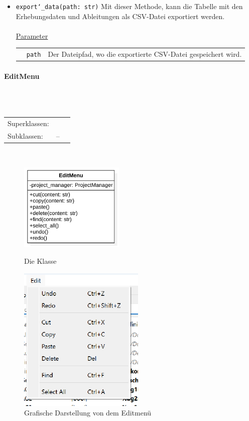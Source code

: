 \documentclass{article}
\newcommand{\classheader}[2][]{\paragraph{#2}
\mbox{}\textit{#1}\\\\}
\newcommand{\classref}[1]{\texttt{\nameref{cls:#1}}}
\begin{document}
\begin{itemize}
\item \texttt{export\char`_data(path: str)} \newline Mit dieser Methode, kann die Tabelle mit den Erhebungsdaten und Ableitungen als CSV-Datei exportiert werden.
\\\\
\underline{{Parameter}}\\
\begin{tabular}{lll}
 & \texttt{path} & Der Dateipfad, wo die exportierte CSV-Datei gespeichert wird. \\
\end{tabular}
\end{itemize}

\newpage
\classheader[]{EditMenu}\label{cls:EditMenu}
\begin{tabular}{lll}
 Superklassen: & \classref{Menu}\\
 Subklassen: & --\\
\end{tabular}\\
\begin{figure}[H]%
    \centering
    \begin{minipage}[b]{0.4\textwidth}
        \includegraphics[width=5cm]{docs/entwurf/Entwurf_dokument/img/klassenView/EditMenu.png}
        \caption{Die Klasse \classref{EditMenu}}
    \end{minipage}
    \hfill
    \begin{minipage}[b]{0.4\textwidth}
        \includegraphics[width=6cm]{docs/entwurf/Entwurf_dokument/img/Alissa/FileMenuGUI.png} %
        \caption{Grafische Darstellung von dem Editmenü}
        \label{fig:EditMenuGUI}
    \end{minipage}
\end{figure}
\end{document}
